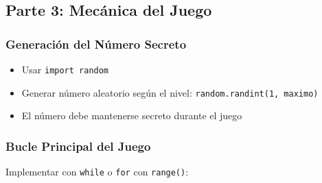 \documentclass[12pt,a4paper]{article}
\begin{document}
\subsection{Parte 3: Mecánica del Juego}

\subsubsection{Generación del Número Secreto}

\begin{itemize}
    \item Usar \texttt{import random}
    \item Generar número aleatorio según el nivel: \texttt{random.randint(1, maximo)}
    \item El número debe mantenerse secreto durante el juego
\end{itemize}

\subsubsection{Bucle Principal del Juego}

Implementar con \texttt{while} o \texttt{for} con \texttt{range()}:
\end{document}
